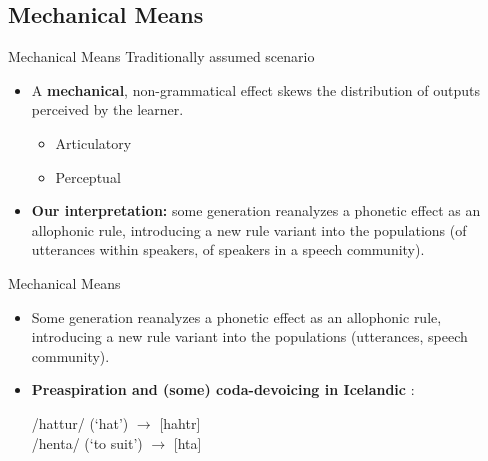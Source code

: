 \documentclass[hyperref={pdfpagelabels=false}]{beamer}
\begin{document}
\subsection{Mechanical Means}
\begin{frame}{Mechanical Means}
	Traditionally assumed scenario \citep{Ohala1981} \\
	\begin{itemize}
		\item A \textbf{mechanical}, non-grammatical effect skews the distribution of outputs perceived by the learner.
		\begin{itemize} \pause
			\item Articulatory \pause
			\item Perceptual \pause
		\end{itemize}
		\item \textbf{Our interpretation:} some generation reanalyzes a phonetic effect as an allophonic rule, introducing a new rule variant into the populations (of utterances within speakers, of speakers in a speech community).
	\end{itemize}



\end{frame}

\begin{frame}{Mechanical Means}
	\begin{itemize}
		\item Some generation reanalyzes a phonetic effect as an allophonic rule, introducing a new rule variant into the populations (utterances, speech community).
		\item \textbf{Preaspiration and (some) coda-devoicing in Icelandic} \citep[][]{kristjan1980, kristjan1986}: \\
		\begin{center}
		/hattur/ (`hat') $\rightarrow$ [hahtr]\\ /henta/ (`to suit') $\rightarrow$ [h\textepsilon{}ta]
		\end{center}
	\end{itemize}

\end{frame}
\end{document}
